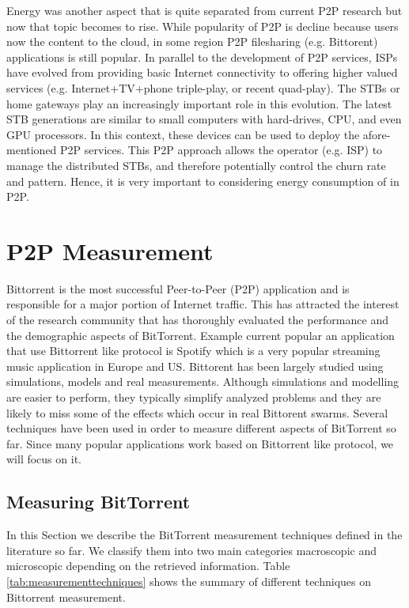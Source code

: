 Energy was another aspect that is quite separated from current P2P research but now that topic becomes to rise. 
While popularity of P2P is decline because users now the content to the cloud, in some region P2P filesharing (e.g. Bittorent) applications is still popular.
In parallel to the development of P2P services, ISPs have evolved from providing basic Internet connectivity to offering higher valued services (e.g. Internet+TV+phone triple-play, or recent quad-play). 
The STBs or home gateways play an increasingly important role in this evolution. 
The latest STB generations are similar to small computers with hard-drives, CPU, and even GPU processors. 
In this context, these devices can be used to deploy the afore-mentioned P2P services. 
This P2P approach allows the operator (e.g. ISP) to manage the distributed STBs, and therefore potentially control the churn rate and pattern. 
Hence, it is very important to considering energy consumption of in P2P.





\section{P2P Measurement}

Bittorrent is the most successful Peer-to-Peer (P2P) application and is responsible for a major portion of Internet traffic. 
This has attracted the interest of the research community that has thoroughly evaluated the performance and the demographic aspects of BitTorrent. 
Example current popular an application that use Bittorrent like protocol is Spotify which is a very popular streaming music application in Europe and US.
Bittorent has been largely studied using simulations, models and real measurements. 
Although simulations and modelling are easier to perform, they typically simplify analyzed problems and they are likely to miss some of the effects which occur in real Bittorent swarms. 
Several techniques have been used in order to measure different aspects of BitTorrent so far. 
Since many popular applications work based on Bittorrent like protocol, we will focus on it.

\subsection{Measuring BitTorrent}
In this Section we describe the BitTorrent measurement techniques defined in the literature so far. 
We classify them into two main categories macroscopic and microscopic depending on the retrieved information. 
Table \ref{tab:measurementtechniques} shows the summary of different techniques on Bittorrent measurement. 


